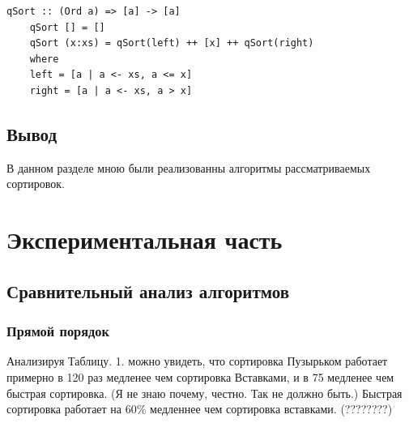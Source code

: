 \documentclass[12pt]{report}
\begin{document}
\begin{lstlisting}[label=some-code,caption=Быстрая сортировка]
	qSort :: (Ord a) => [a] -> [a]
	qSort [] = []
	qSort (x:xs) = qSort(left) ++ [x] ++ qSort(right)
	where
	left = [a | a <- xs, a <= x]
	right = [a | a <- xs, a > x]
\end{lstlisting}


\section*{Вывод}
В данном разделе мною были реализованны алгоритмы рассматриваемых сортировок.

\chapter{Экспериментальная часть}
\section{Сравнительный анализ алгоритмов}

\subsection{Прямой порядок}

Анализируя Таблицу. 1. можно увидеть, что сортировка Пузырьком работает примерно в 120 раз медленее чем сортировка Вставками, и в 75 медленее чем быстрая сортировка.
(Я не знаю почему, честно. Так не должно быть.)
Быстрая сортировка работает на 60\% медленнее чем сортировка вставками. (????????)
\end{document}
